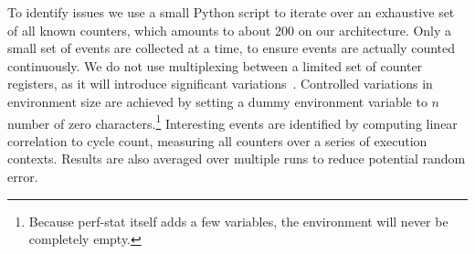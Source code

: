 \documentclass[10pt, conference, compsocconf]{IEEEtran}
\begin{document}
To identify issues we use a small Python script to iterate over an exhaustive set of all known counters, which amounts to about 200 on our architecture.
Only a small set of events are collected at a time, to ensure events are actually counted continuously.
We do not use multiplexing between a limited set of counter registers, as it will introduce significant variations~\cite{Wiplove:ImproveEstimation}. %
Controlled variations in environment size are achieved by setting a dummy environment variable to $n$ number of zero characters.\footnote{Because perf-stat itself adds a few variables, the environment will never be completely empty.}
Interesting events are identified by computing linear correlation to cycle count, measuring all counters over a series of execution contexts.
Results are also averaged over multiple runs to reduce potential random error.%

\end{document}
